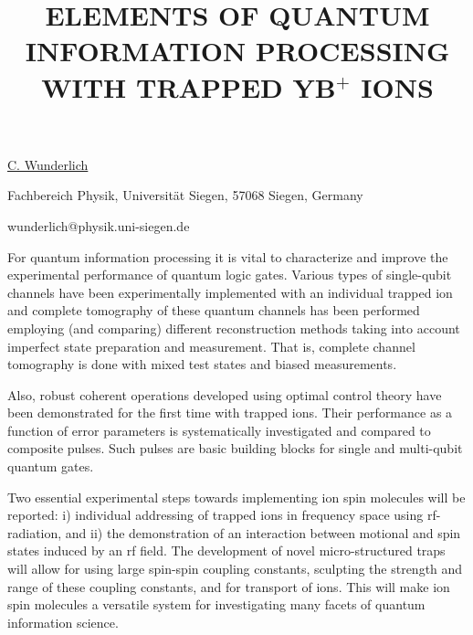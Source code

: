 \title{ELEMENTS OF QUANTUM INFORMATION PROCESSING WITH TRAPPED YB$^+$ IONS}

\underline{C. Wunderlich} 

{\normalsize{\vspace{-4mm}
Fachbereich Physik, Universit\"{a}t Siegen, 57068 Siegen, Germany

\email wunderlich@physik.uni-siegen.de}}

For quantum information processing it is vital to characterize and
improve the experimental performance of quantum logic gates. Various
types of single-qubit channels have been experimentally implemented
with an individual trapped ion and complete tomography of these
quantum channels has been performed employing (and comparing) different
reconstruction methods taking into account imperfect state preparation and measurement.
That is, complete channel tomography is done with mixed test states and
biased measurements.

Also, robust coherent operations developed using optimal control theory have been
demonstrated for the first time with trapped ions. Their performance as a function
of error parameters is systematically investigated and compared to composite pulses.
Such pulses are basic building blocks for single and multi-qubit quantum
gates.

Two essential experimental steps towards implementing ion spin
molecules will be reported: i) individual addressing of trapped ions
in frequency space using rf-radiation, and ii) the demonstration of
an interaction between motional and spin states induced by an rf
field. The development of novel micro-structured traps will allow
for using large spin-spin coupling constants, sculpting the strength
and range of these coupling constants, and for transport of ions.
This will make ion spin molecules a versatile system for
investigating many facets of quantum information science.

\vspace{\baselineskip}